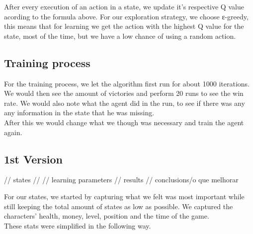 \documentclass{article}
\begin{document}
  After every execution of an action in a state, we update it's respective Q value acording to the formula above. 
  For our exploration strategy, we choose ε-greedy, this means that for learning we get the action with the highest Q value for
  the state, most of the time, but we have a low chance of using a random action.\\
  
  \subsection{Training process}
  For the training process, we let the algorithm first run for about 1000 iterations.
  We would then see the amount of victories and perform 20 runs to see the win rate.
  We would also note what the agent did in the run, to see if there was any any information
  in the state that he was missing.\\
  After this we would change what we though was necessary and train the agent again.

  \subsection{1st Version}
  // states
  // 
  // learning parameters
  // results
  // conclusions/o que melhorar

  For our states, we started by capturing what we felt was most important while still keeping the total amount of states as low as possible.
  We captured the characters' health, money, level, position and the time of the game.\\
  These stats were simplified in the following way.\\
\end{document}
